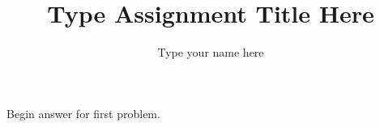 \documentclass[12pt]{article}
\title{Type Assignment Title Here}
\author{Type your name here}
\newenvironment{problem}[2][Problem]{\begin{trivlist}
\item[\hskip \labelsep {\bfseries #1}\hskip \labelsep {\bfseries #2.}]}{\end{trivlist}}
\begin{document}
\maketitle

 
\begin{problem}{?}
	Begin answer for first problem.
\end{problem}

	
\end{document}
